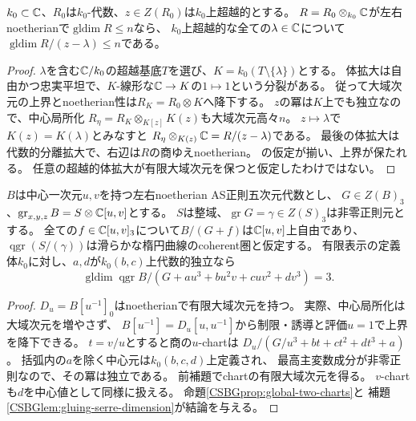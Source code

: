 \begin{lemma}[超越的中心値の有限大域次元]
\label{CSBGlem:global-transcendental}
$k_0\subset\mathbb C$、$R_0$は$k_0$-代数、$z\in Z(R_0)$は$k_0$上超越的とする。
$R=R_0\otimes_{k_0}\mathbb C$が左右noetherianで$\operatorname{gldim}R\le n$なら、
$k_0$上超越的な全ての$\lambda\in\mathbb C$について
$\operatorname{gldim}R/(z-\lambda)\le n$である。
\end{lemma}
\begin{proof}
$\lambda$を含む$\mathbb C/k_0$の超越基底$T$を選び、$K=k_0(T\setminus\{\lambda\})$とする。
体拡大は自由かつ忠実平坦で、$K$-線形な$\mathbb C\to K$の$1\mapsto1$という分裂がある。
従って大域次元の上界とnoetherian性は$R_K=R_0\otimes K$へ降下する。
$z$の冪は$K$上でも独立なので、中心局所化
$R_\eta=R_K\otimes_{K[z]}K(z)$も大域次元高々$n$。
$z\mapsto\lambda$で$K(z)=K(\lambda)$とみなすと
$R_\eta\otimes_{K(z)}\mathbb C=R/(z-\lambda)$である。
最後の体拡大は代数的分離拡大で、右辺は$R$の商ゆえnoetherian。
\cite[Lemmas~3.2, 3.3]{CSBGRSVBertini}の仮定が揃い、上界が保たれる。
任意の超越的体拡大が有限大域次元を保つと仮定したわけではない。
\end{proof}

\begin{theorem}
\label{CSBGthm:global-very-general}
$B$は中心一次元$u,v$を持つ左右noetherian AS正則五次元代数とし、
$G\in Z(B)_3$、$\operatorname{gr}_{x,y,z}B=S\otimes\mathbb C[u,v]$とする。
$S$は整域、$\operatorname{gr}G=\gamma\in Z(S)_3$は非零正則元とする。
全ての$f\in\mathbb C[u,v]_3$について$B/(G+f)$は$\mathbb C[u,v]$上自由であり、
$\operatorname{qgr}(S/(\gamma))$は滑らかな楕円曲線のcoherent圏と仮定する。
有限表示の定義体$k_0$に対し、$a,d$が$k_0(b,c)$上代数的独立なら
\[
 \operatorname{gldim}\operatorname{qgr}
 B/(G+au^3+bu^2v+cuv^2+dv^3)=3.
\]
\end{theorem}
\begin{proof}
$D_u=B[u^{-1}]_0$はnoetherianで有限大域次元を持つ。
実際、中心局所化は大域次元を増やさず、
$B[u^{-1}]=D_u[u,u^{-1}]$から制限・誘導と評価$u=1$で上界を降下できる。
$t=v/u$とすると商の$u$-chartは
$D_u/(G/u^3+bt+ct^2+dt^3+a)$。
括弧内の$a$を除く中心元は$k_0(b,c,d)$上定義され、
最高主変数成分が非零正則なので、その冪は独立である。
前補題でchartの有限大域次元を得る。
$v$-chartも$d$を中心値として同様に扱える。
命題\ref{CSBGprop:global-two-charts}と
補題\ref{CSBGlem:gluing-serre-dimension}が結論を与える。
\end{proof}

